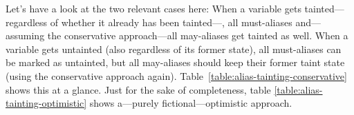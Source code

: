 Let's have a look at the two relevant cases here: When a variable gets tainted---regardless of whether it already has been tainted---, all must-aliases and---assuming the conservative approach---all may-aliases get tainted as well. When a variable gets untainted (also regardless of its former state), all must-aliases can be marked as untainted, but all may-aliases should keep their former taint state (using the conservative approach again). Table~\ref{table:alias-tainting-conservative} shows this at a glance. Just for the sake of completeness, table \ref{table:alias-tainting-optimistic} shows a---purely fictional---optimistic approach.


